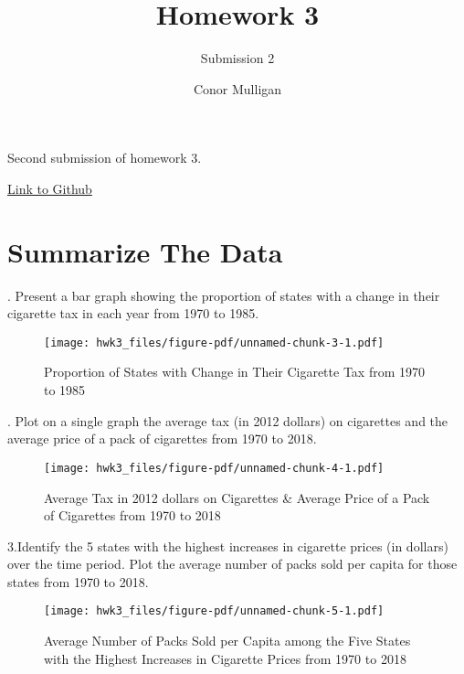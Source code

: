 \documentclass[
  letterpaper,
  DIV=11,
  numbers=noendperiod]{scrartcl}
\title{Homework 3}
\subtitle{Submission 2}
\author{Conor Mulligan}
\date{}
\begin{document}
\maketitle

Second submission of homework 3.

\href{https://github.com/cmulliga/homework-3}{Link to Github}

\newpage

\section{Summarize The Data}\label{summarize-the-data}

\vspace{.2in}

. Present a bar graph showing the proportion of states with a
change in their cigarette tax in each year from 1970 to 1985.

\begin{figure}[H]

{\centering \texttt{[image: hwk3\_files/figure-pdf/unnamed-chunk-3-1.pdf]}

}

\caption{Proportion of States with Change in Their Cigarette Tax from
1970 to 1985}

\end{figure}%

\newpage

. Plot on a single graph the average tax (in 2012 dollars) on
cigarettes and the average price of a pack of cigarettes from 1970 to
2018.

\begin{figure}[H]

{\centering \texttt{[image: hwk3\_files/figure-pdf/unnamed-chunk-4-1.pdf]}

}

\caption{Average Tax in 2012 dollars on Cigarettes \& Average Price of a
Pack of Cigarettes from 1970 to 2018}

\end{figure}%

\newpage

\noindent 3.Identify the 5 states with the highest increases in
cigarette prices (in dollars) over the time period. Plot the average
number of packs sold per capita for those states from 1970 to 2018.

\begin{figure}[H]

{\centering \texttt{[image: hwk3\_files/figure-pdf/unnamed-chunk-5-1.pdf]}

}

\caption{Average Number of Packs Sold per Capita among the Five States
with the Highest Increases in Cigarette Prices from 1970 to 2018}

\end{figure}%
\end{document}
